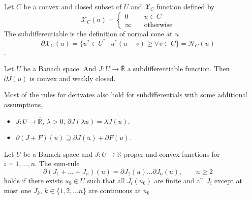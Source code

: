 \begin{example}
	Let $C$ be a convex and closed subset of $U$ and $\mathcal{X}_C$ function defined by
	\[
		\mathcal{X}_C (u)=
		\left\lbrace
		\begin{array}{cl}
			0 \quad& u\in C \\
			\infty \quad& \text{otherwise}
		\end{array}
		\right.
	\]
	The subdifferentiable is the definition of normal cone at $u$
	\[\partial \mathcal{X}_C (u)=\lbrace u^* \in U^* \ | \ u^*(u-v)\geq \forall v \in C\rbrace = \mathcal{N}_C(u)\].

\end{example}

\begin{theorem}
	Let $U$ be a Banach space. And $J: U\rightarrow \overline{\mathbb{R}}$ a subdifferentiable function. Then $\partial J(u)$ is convex and weakly closed.
\end{theorem}

\begin{remark}
	Most of the rules for derivates also hold for subdifferentials with some additional assumptions,
	\begin{itemize}
		\item $J:U\rightarrow \overline{\mathbb{R}}$, $\lambda > 0$, $\partial J(\lambda u)=\lambda J(u)$.
		\item $\partial(J+F)(u) \supseteq \partial J(u)+ \partial F(u)$.
	\end{itemize}
\end{remark}

\begin{theorem}[Rockefeller]
	Let $U$ be a Banach space and $J: U\rightarrow \mathbb{R}$ proper and convex functions for $i=1,\dots, n$.
	The sum-rule
	\[
		\partial(J_1+\dots+J_n)(u)=\partial J_1(u)\dots \partial J_n(u), \qquad n\geq 2
	\]
	holds if there exists $u_0 \in U$ such that all $J_i(u_0)$ are finite and all $J_i$ except at most one $J_k$, $k\in \lbrace 1,2,\dots n\rbrace$ are continuous at $u_0$
\end{theorem}